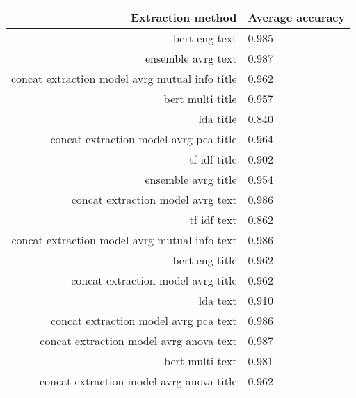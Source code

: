 \begin{tabular}{|r|l|}
  \hline
  Extraction method & Average accuracy \\ 
  \hline
  bert eng text & 0.985 \\ 
  \hline
  ensemble avrg text & 0.987 \\ 
  \hline
  concat extraction model avrg mutual info title & 0.962 \\ 
  \hline
  bert multi title & 0.957 \\ 
  \hline
  lda title & 0.840 \\ 
  \hline
  concat extraction model avrg pca title & 0.964 \\ 
  \hline
  tf idf title & 0.902 \\ 
  \hline
  ensemble avrg title & 0.954 \\ 
  \hline
  concat extraction model avrg text & 0.986 \\ 
  \hline
  tf idf text & 0.862 \\ 
  \hline
  concat extraction model avrg mutual info text & 0.986 \\ 
  \hline
  bert eng title & 0.962 \\ 
  \hline
  concat extraction model avrg title & 0.962 \\ 
  \hline
  lda text & 0.910 \\ 
  \hline
  concat extraction model avrg pca text & 0.986 \\ 
  \hline
  concat extraction model avrg anova text & 0.987 \\ 
  \hline
  bert multi text & 0.981 \\ 
  \hline
  concat extraction model avrg anova title & 0.962 \\ 
  \hline
\end{tabular}
